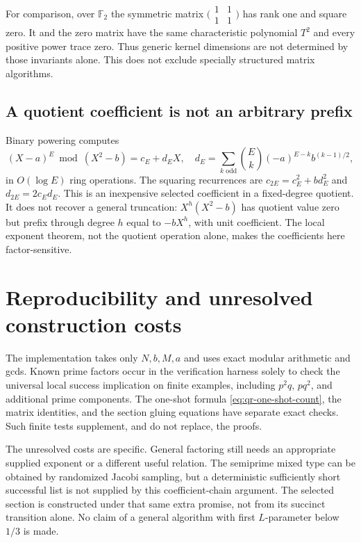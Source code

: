 For comparison, over $\mathbb F_2$ the symmetric matrix
$\bigl(\begin{smallmatrix}1&1\\1&1\end{smallmatrix}\bigr)$ has rank
one and square zero.  It and the zero matrix have the same characteristic
polynomial $T^2$ and every positive power trace zero.  Thus generic
kernel dimensions are not determined by those invariants alone.
This does not exclude specially structured matrix algorithms.

\subsection{A quotient coefficient is not an arbitrary prefix}

Binary powering computes
\[
 (X-a)^E\bmod(X^2-b)=c_E+d_EX,
 \quad
 d_E=\sum_{k\text{ odd}}\binom Ek(-a)^{E-k}b^{(k-1)/2},
\]
in $O(\log E)$ ring operations.  The squaring recurrences are
$c_{2E}=c_E^2+bd_E^2$ and $d_{2E}=2c_Ed_E$.
This is an inexpensive selected coefficient in a fixed-degree quotient.
It does not recover a general truncation: $X^h(X^2-b)$ has quotient
value zero but prefix through degree $h$ equal to $-bX^h$, with unit
coefficient.  The local exponent theorem, not the quotient operation
alone, makes the coefficients here factor-sensitive.

\section{Reproducibility and unresolved construction costs}

The implementation takes only $N,b,M,a$ and uses exact modular
arithmetic and gcds.  Known prime factors occur in the verification
harness solely to check the universal local success implication on
finite examples, including $p^2q$, $pq^2$, and additional prime
components.  The one-shot formula \eqref{eq:qr-one-shot-count}, the
matrix identities, and the section gluing equations have separate exact
checks.  Such finite tests supplement, and do not replace, the proofs.

The unresolved costs are specific.  General factoring still needs an
appropriate supplied exponent or a different useful relation.  The
semiprime mixed type can be obtained by randomized Jacobi sampling, but
a deterministic sufficiently short successful list is not supplied by
this coefficient-chain argument.  The selected section is constructed
under that same extra promise, not from its succinct transition alone.
No claim of a general algorithm with first $L$-parameter below $1/3$
is made.
